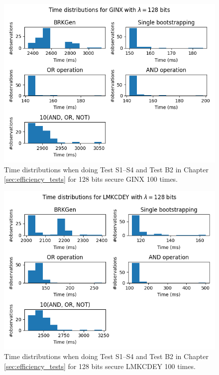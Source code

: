 \begin{figure}[ht]
    \centering
    \includegraphics[width=\textwidth]{data/figures/GINX_STD128_distributions.png}
    \caption{Time distributions when doing Test S1--S4 and Test B2 in Chapter \ref{sec:efficiency_tests} for 128 bits secure GINX 100 times.}
    \label{fig:distr_ginx128}
\end{figure}

\begin{figure}[ht]
    \centering
    \includegraphics[width=\textwidth]{data/figures/LMKCDEY_STD128LMKCDEY_distributions.png}
    \caption{Time distributions when doing Test S1--S4 and Test B2 in Chapter \ref{sec:efficiency_tests} for 128 bits secure LMKCDEY 100 times.}
    \label{fig:distr_lmkcdey128}
\end{figure}

